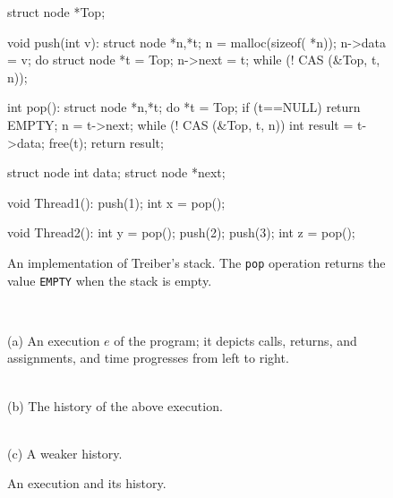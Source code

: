 \begin{figure}[t]
  \scriptsize
  \begin{minipage}[t]{41mm}
    \begin{program}
struct node *Top;      
      
void push(int v):
  struct node *n,*t;
  n = malloc(sizeof( *n));
  n->data = v;
  do {
    struct node *t = Top;
    n->next = t;
  } while (! CAS (&Top, t, n));
    \end{program}
  \end{minipage}
  \begin{minipage}[t]{40mm}
    \begin{program}
int pop():
  struct node *n,*t;
  do {
    *t = Top;
    if (t==NULL) return EMPTY;
    n = t->next;
  } while (! CAS (&Top, t, n))
  int result = t->data;
  free(t);
  return result;
    \end{program}
  \end{minipage}
  \begin{minipage}[t]{30mm}
    \begin{program}
struct node {
  int data;
  struct node *next;
}
    \end{program}
  \end{minipage}
  \begin{minipage}[t]{25mm}
    \begin{program}
void Thread1():
  push(1);
  int x = pop();
    \end{program}
  \end{minipage}
  \begin{minipage}[t]{25mm}
    \begin{program}
void Thread2():
  int y = pop();
  push(2);
  push(3);
  int z = pop();
    \end{program}
  \end{minipage}
  \caption{An implementation of Treiber's stack. The {\tt pop} operation
  returns the value {\tt EMPTY} when the stack is empty.}
  \label{fig:treiber}
\end{figure}

\begin{figure}[t]
  \footnotesize
  \centering
   \\
  \smallskip
  \parbox{0.8\linewidth}{(a) An execution $e$ of the program; it depicts calls,
  returns, and assignments, and time progresses from left to right.}

  \bigskip
  \begin{minipage}{45mm}
     \\
    (b) The history of the above execution.
  \end{minipage}
  \hfill
  \begin{minipage}{35mm}
     \\
    (c) A weaker history.
  \end{minipage}

  \caption{An execution and its history.}
  \label{fig:stacks}
\end{figure}

